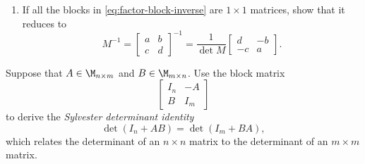 \documentclass{homework}
\begin{document}
\begin{problem}[P.3.28]
\begin{enumerate}
  \item If all the blocks in \eqref{eq:factor-block-inverse} are
    \(1\times1\) matrices, show that it reduces to
    \[
      M^{-1} = \begin{bmatrix}a&b\\c&d\end{bmatrix}^{-1} =
      \frac{1}{\det M} \begin{bmatrix}d&-b\\-c&a\end{bmatrix}.
    \]

    \begin{solution}
    \end{solution}

  \end{enumerate}
\end{problem}

\begin{problem}[P.3.29]
  Suppose that \(A \in \M_{n\times m}\) and
  \(B \in \M_{m\times n}\).  Use the block matrix
  \[
    \begin{bmatrix}
      I_n & -A \\
      B   & I_m
    \end{bmatrix}
  \]
  to derive the \emph{Sylvester determinant identity}
  \begin{equation}
    \det(I_n + AB) = \det(I_m + BA), \label{eq:sylvester-det-identity}
  \end{equation}
  which relates the determinant of an \(n\times n\) matrix to the
  determinant of an \(m\times m\) matrix.

  \begin{solution}
  \end{solution}

\end{problem}
\end{document}
